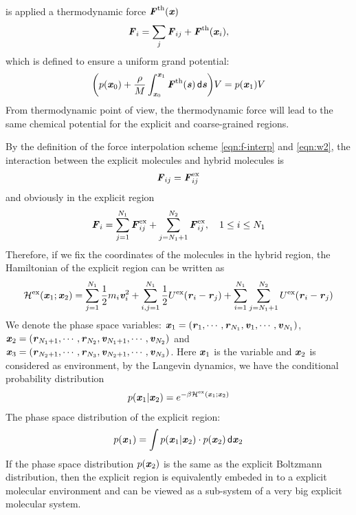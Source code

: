 \documentclass[aps,pre,preprint]{revtex4}
\renewcommand{\v}[1]{\textbf{\textit{#1}}}
\renewcommand{\d}[1]{\textsf{#1}}
\begin{document}
is applied a thermodynamic force $\v F^{\textrm{th}}(\v x)$
\begin{align}
  \v F_i = \sum_j\v F_{ij} + \v F^{\textrm{th}}(\v x_i),
\end{align}
which is defined to ensure a uniform grand potential:
\begin{align}
  \bigg(
  p(\v x_0) +
  \frac{\rho}{M}\int_{\v x_0}^{\v x_1}\v F^{\textrm{th}}(\v s)\,\d d\v s
  \bigg) V
  =
  p(\v x_1) V
\end{align}
From thermodynamic point of view, the thermodynamic force will lead
to the same chemical potential for the explicit and coarse-grained regions.

By the definition of the force interpolation scheme
\eqref{eqn:f-interp} and \eqref{eqn:w2}, the interaction between the
explicit molecules and hybrid molecules is
\begin{align}
  \v F_{ij} = \v F^{\textrm{ex}}_{ij}
\end{align}
and obviously in the explicit region
\begin{align}
  \v F_i =
  \sum_{j=1}^{N_1}\v F^{\textrm{ex}}_{ij} + \sum_{j=N_1+1}^{N_2}\v F^{\textrm{ex}}_{ij}, \quad 1\leq i \leq N_1
\end{align}
Therefore, if we fix the coordinates of the molecules in the hybrid
region, the Hamiltonian of the explicit region can be written as
\begin{align}
  \mathcal H^{\textrm{ex}}(\v x_1; \v x_2) =
  \sum_{j=1}^{N_1}\frac12 m_i\v v_i^2 + 
  \sum_{i,j=1}^{N_1}\frac12 U^{\textrm{ex}}(\v r_i - \v r_j) + 
  \sum_{i=1}^{N_1}\sum_{j=N_1+1}^{N_2} U^{\textrm{ex}}(\v r_i - \v r_j) 
\end{align}
We denote the phase space variables: $\v x_1 = (\v r_1, \cdots, \v
r_{N_1}, \v v_1, \cdots, \v v_{N_1})$,  $\v x_2 = (\v r_{N_1+1},
\cdots, \v r_{N_2}, \v v_{N_1+1}, \cdots, \v v_{N_2})$ and
$\v x_3 = (\v r_{N_2+1},
\cdots, \v r_{N_3}, \v v_{N_2+1}, \cdots, \v v_{N_3})$.
Here $\v x_1$ is the variable and $\v x_2$ is considered as environment, 
by the Langevin dynamics, we have the conditional probability distribution
\begin{align}
  p (\v x_1 \vert \v x_2)  =
  e^{-\beta \mathcal H^{\textrm{ex}}(\v x_1; \v x_2)}
\end{align}
The phase space distribution of the explicit region:
\begin{align}
  p(\v x_1) = \int p(\v x_1\vert\v x_2)\cdot p (\v x_2) \,\d d\v x_2
\end{align}
If the phase space distribution $p(\v x_2)$ is the same as the explicit
Boltzmann distribution, then the explicit region is
equivalently embeded in to a explicit molecular environment and can be
viewed as a sub-system of a very big explicit molecular
system.
\end{document}
